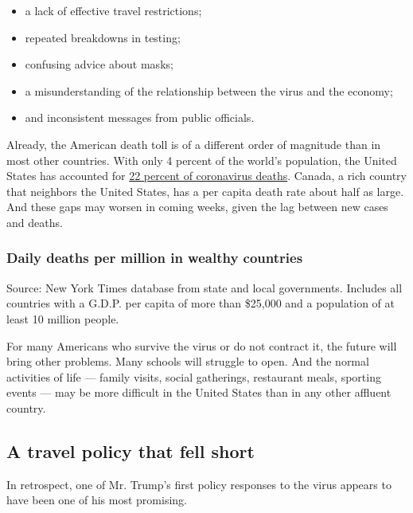 \begin{itemize}
\item
  a lack of effective travel restrictions;
\item
  repeated breakdowns in testing;
\item
  confusing advice about masks;
\item
  a misunderstanding of the relationship between the virus and the
  economy;
\item
  and inconsistent messages from public officials.
\end{itemize}

Already, the American death toll is of a different order of magnitude
than in most other countries. With only 4 percent of the world's
population, the United States has accounted for
\href{https://www.nytimes.com/interactive/2020/world/coronavirus-maps.html}{22
percent of coronavirus deaths}. Canada, a rich country that neighbors
the United States, has a per capita death rate about half as large. And
these gaps may worsen in coming weeks, given the lag between new cases
and deaths.

\hypertarget{daily-deaths-per-million-in-wealthy-countries}{%
\subsubsection{Daily deaths per million in wealthy
countries}\label{daily-deaths-per-million-in-wealthy-countries}}

Source: New York Times database from state and local governments.
Includes all countries with a G.D.P. per capita of more than \$25,000
and a population of at least 10 million people.

For many Americans who survive the virus or do not contract it, the
future will bring other problems. Many schools will struggle to open.
And the normal activities of life --- family visits, social gatherings,
restaurant meals, sporting events --- may be more difficult in the
United States than in any other affluent country.

\hypertarget{a-travel-policy-that-fell-short}{%
\subsection{A travel policy that fell
short}\label{a-travel-policy-that-fell-short}}

In retrospect, one of Mr. Trump's first policy responses to the virus
appears to have been one of his most promising.

